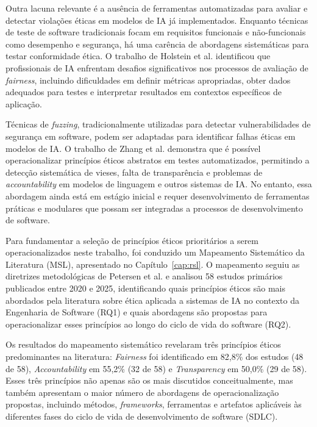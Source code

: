 Outra lacuna relevante é a ausência de ferramentas automatizadas para avaliar e detectar violações éticas em modelos de IA já implementados. Enquanto técnicas de teste de software tradicionais focam em requisitos funcionais e não-funcionais como desempenho e segurança, há uma carência de abordagens sistemáticas para testar conformidade ética. O trabalho de Holstein et al. \cite{Holstein2019} identificou que profissionais de IA enfrentam desafios significativos nos processos de avaliação de \textit{fairness}, incluindo dificuldades em definir métricas apropriadas, obter dados adequados para testes e interpretar resultados em contextos específicos de aplicação.

Técnicas de \textit{fuzzing}, tradicionalmente utilizadas para detectar vulnerabilidades de segurança em software, podem ser adaptadas para identificar falhas éticas em modelos de IA. O trabalho de Zhang et al. \cite{Zhang2019} demonstra que é possível operacionalizar princípios éticos abstratos em testes automatizados, permitindo a detecção sistemática de vieses, falta de transparência e problemas de \textit{accountability} em modelos de linguagem e outros sistemas de IA. No entanto, essa abordagem ainda está em estágio inicial e requer desenvolvimento de ferramentas práticas e modulares que possam ser integradas a processos de desenvolvimento de software.

Para fundamentar a seleção de princípios éticos prioritários a serem operacionalizados neste trabalho, foi conduzido um Mapeamento Sistemático da Literatura (MSL), apresentado no Capítulo~\ref{cap:rsl}. O mapeamento seguiu as diretrizes metodológicas de Petersen et al. \cite{Petersen2015} e analisou 58 estudos primários publicados entre 2020 e 2025, identificando quais princípios éticos são mais abordados pela literatura sobre ética aplicada a sistemas de IA no contexto da Engenharia de Software (RQ1) e quais abordagens são propostas para operacionalizar esses princípios ao longo do ciclo de vida do software (RQ2).

Os resultados do mapeamento sistemático revelaram três princípios éticos predominantes na literatura: \textit{Fairness} foi identificado em 82,8\% dos estudos (48 de 58), \textit{Accountability} em 55,2\% (32 de 58) e \textit{Transparency} em 50,0\% (29 de 58). Esses três princípios não apenas são os mais discutidos conceitualmente, mas também apresentam o maior número de abordagens de operacionalização propostas, incluindo métodos, \textit{frameworks}, ferramentas e artefatos aplicáveis às diferentes fases do ciclo de vida de desenvolvimento de software (SDLC).

